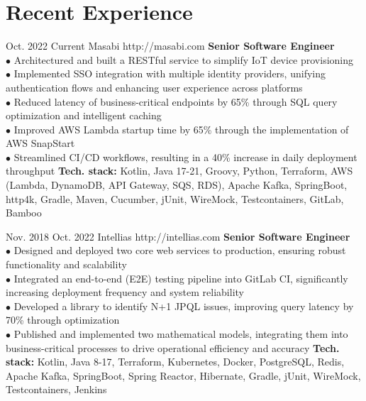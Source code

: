 \documentclass[10pt]{article} %
\begin{document}
\section{Recent Experience}
\job
{Oct. 2022 }{ Current}
{Masabi}
{http://masabi.com}
{\textbf{Senior Software Engineer}}
{
\textbf{}   
\\$\bullet$ Architectured and built a RESTful service to simplify IoT device provisioning
\\$\bullet$ Implemented SSO integration with multiple identity providers, unifying authentication flows and enhancing user experience across platforms
\\$\bullet$ Reduced latency of business-critical endpoints by 65\% through SQL query optimization and intelligent caching
\\$\bullet$ Improved AWS Lambda startup time by 65\% through the implementation of AWS SnapStart
\\$\bullet$ Streamlined CI/CD workflows, resulting in a 40\% increase in daily deployment throughput
\vadjust{\vspace{4pt}}
\newline
\textbf{Tech. stack: }{Kotlin, Java 17-21, Groovy, Python, Terraform, AWS (Lambda, DynamoDB, API Gateway, SQS, RDS), Apache Kafka, SpringBoot, http4k, Gradle, Maven, Cucumber, jUnit, WireMock, Testcontainers, GitLab, Bamboo}   
 }
 
 \job
{Nov. 2018 }{ Oct. 2022}
{Intellias}
{http://intellias.com}
{\textbf{Senior Software Engineer}}
{
\textbf{}   
\\$\bullet$ Designed and deployed two core web services to production, ensuring robust functionality and scalability
\\$\bullet$ Integrated an end-to-end (E2E) testing pipeline into GitLab CI, significantly increasing deployment frequency and system reliability
\\$\bullet$ Developed a library to identify N+1 JPQL issues, improving query latency by 70\% through optimization
\\$\bullet$ Published and implemented two mathematical models, integrating them into business-critical processes to drive operational efficiency and accuracy
\vadjust{\vspace{4pt}}
\newline
\textbf{Tech. stack: }{Kotlin, Java 8-17, Terraform, Kubernetes, Docker, PostgreSQL, Redis, Apache Kafka, SpringBoot, Spring Reactor, Hibernate, Gradle, jUnit, WireMock, Testcontainers, Jenkins}   
 }
\end{document}
